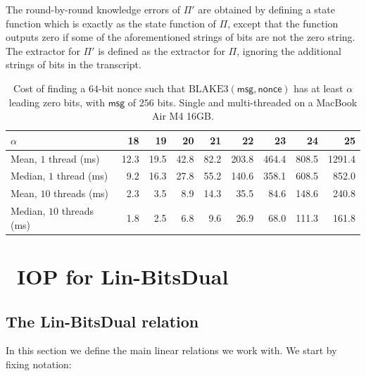 \documentclass[11pt,letterpaper,usenames,dvipsnames]{article}
\begin{document}
 The round-by-round knowledge errors of $\Pi'$ are obtained by defining a state function which is exactly as the state function of $\Pi$, except that the function outputs zero if some of the aforementioned strings of bits are not the zero string. The extractor for $\Pi'$ is defined as the extractor for $\Pi$, ignoring the additional strings of bits in the transcript.

\begin{table}[H]
  \centering
  \small
  \setlength{\tabcolsep}{5pt}
  \caption{Cost of finding a $64$-bit nonce such that $\text{BLAKE3}(\mathsf{msg}, \mathsf{nonce})$ has at least $\alpha$ leading zero
    bits, with $\mathsf{msg}$ of $256$ bits. Single and multi-threaded on a MacBook Air M4 16GB. }
  \label{tab:grinding-cost}
      \begin{tabular}{@{}l rrrrrrrr@{}}
    \toprule
    $\alpha$ & 18 & 19 & 20 & 21 & 22 & 23 & 24 & 25 \\
    \midrule
    Mean, $1$ thread (ms)     & 12.3 & 19.5 & 42.8 & 82.2 & 203.8 & 464.4 & 808.5 & 1291.4 \\
    Median, $1$ thread (ms)   &  9.2 & 16.3 & 27.8 & 55.2 & 140.6 & 358.1 & 608.5 &  852.0 \\
    Mean, $10$ threads (ms)   &  2.3 &  3.5 &  8.9 & 14.3 &  35.5 &  84.6 & 148.6 &  240.8 \\
    Median, $10$ threads (ms) &  1.8 &  2.5 &  6.8 &  9.6 &  26.9 &  68.0 & 111.3 &  161.8 \\
    \bottomrule
  \end{tabular}
\end{table}
 

\section{\ftwoz \ IOP for Lin-BitsDual}




%


\subsection{The  Lin-BitsDual relation}\label{s:linmodfieldbin}




\renewcommand{\ringtwo}{\FF_q}
\renewcommand{\ringmorphism}{\pi_q}
In this section we define the main linear relations we work with. We start by fixing notation:
\end{document}
